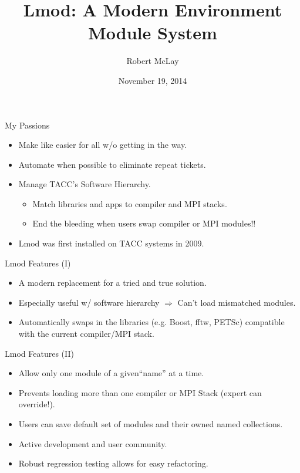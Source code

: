\documentclass{beamer}
\title{Lmod: A Modern Environment Module System}
\author{Robert McLay}
\institute{The Texas Advanced Computing Center}
\date{November 19, 2014}  %
\begin{document}
\begin{frame}
  \titlepage
\end{frame}

\begin{frame}{My Passions}
  \begin{itemize}
    \item Make like easier for all w/o getting in the way.
    \item Automate when possible to eliminate repeat tickets.
    \item Manage TACC's Software Hierarchy.
      \begin{itemize}
        \item Match libraries and apps to compiler and MPI stacks.
        \item End the bleeding  when users swap compiler or MPI modules!!
      \end{itemize}
    \item Lmod was first installed on TACC systems in 2009.

  \end{itemize}
\end{frame}

\begin{frame}{Lmod Features (I)}
  \begin{itemize}
    \item A modern replacement for a tried and true solution.
    \item Especially useful w/ software hierarchy $\Rightarrow$ Can't
      load mismatched modules.
    \item Automatically swaps in the libraries (e.g. Boost, fftw,
      PETSc) compatible with the current compiler/MPI stack.
  \end{itemize}
\end{frame}

\begin{frame}{Lmod Features (II)}
  \begin{itemize}
    \item Allow only one module of a given``name'' at a time.
    \item Prevents loading more than one compiler or
      MPI Stack (expert can override!).
    \item Users can save default set of modules and their owned  named collections.
    \item Active development and user community.
    \item Robust regression testing allows for easy refactoring.
  \end{itemize}
\end{frame}
\end{document}
